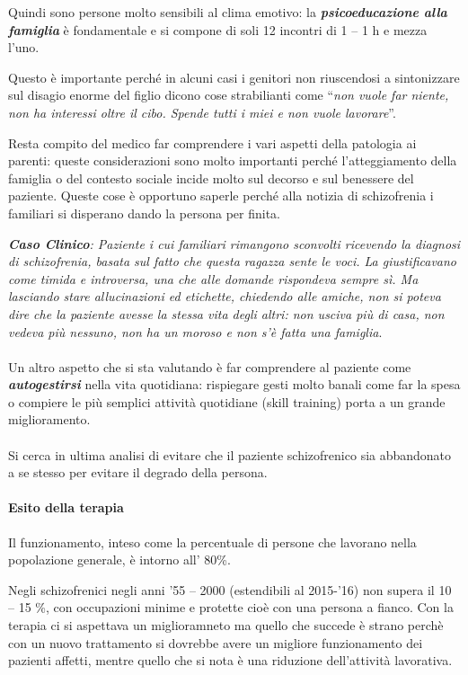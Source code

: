 Quindi sono persone molto sensibili al clima emotivo: la
\textbf{\emph{psicoeducazione alla famiglia}} è fondamentale e si
compone di soli 12 incontri di 1 -- 1 h e mezza l'uno.

Questo è importante perché in alcuni casi i genitori non riuscendosi a
sintonizzare sul disagio enorme del figlio dicono cose strabilianti come
``\emph{non vuole far niente, non ha interessi oltre il cibo. Spende
tutti i miei e non vuole lavorare}''.

Resta compito del medico far comprendere i vari aspetti della patologia
ai parenti: queste considerazioni sono molto importanti perché
l'atteggiamento della famiglia o del contesto sociale incide molto sul
decorso e sul benessere del paziente. Queste cose è opportuno saperle
perché alla notizia di schizofrenia i familiari si disperano dando la
persona per finita.

\emph{\textbf{Caso Clinico}: Paziente i cui familiari rimangono
sconvolti ricevendo la diagnosi di schizofrenia, basata sul fatto che
questa ragazza sente le voci. La giustificavano come timida e
introversa, una che alle domande rispondeva sempre sì. Ma lasciando
stare allucinazioni ed etichette, chiedendo alle amiche, non si poteva
dire che la paziente avesse la stessa vita degli altri: non usciva più
di casa, non vedeva più nessuno, non ha un moroso e non s'è fatta una
famiglia}.
\\\\
Un altro aspetto che si sta valutando è far comprendere al paziente come
\textbf{\emph{autogestirsi}} nella vita quotidiana: rispiegare gesti
molto banali come far la spesa o compiere le più semplici attività
quotidiane (skill training) porta a un grande miglioramento.
\\\\
Si cerca in ultima analisi di evitare che il paziente schizofrenico sia
abbandonato a se stesso per evitare il degrado della persona.

\paragraph{Esito della terapia}

Il funzionamento, inteso come la percentuale di persone che lavorano
nella popolazione generale, è intorno all' 80\%.

Negli schizofrenici negli anni '55 -- 2000 (estendibili al 2015-'16) non
supera il 10 -- 15 \%, con occupazioni minime e protette cioè con una
persona a fianco. Con la terapia ci si aspettava un miglioramneto ma
quello che succede è strano perchè con un nuovo trattamento si dovrebbe
avere un migliore funzionamento dei pazienti affetti, mentre quello che
si nota è una riduzione dell'attività lavorativa.

